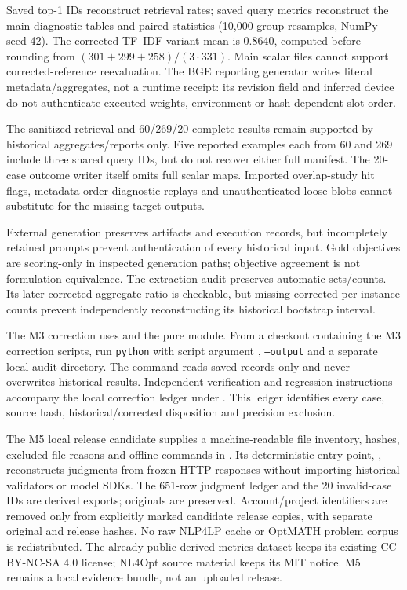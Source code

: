 Saved top-1 IDs reconstruct retrieval rates; saved query metrics reconstruct the main diagnostic tables and paired statistics (10,000 group resamples, NumPy seed 42). The corrected TF--IDF variant mean is 0.8640, computed before rounding from $(301+299+258)/(3\cdot331)$. Main scalar files cannot support corrected-reference reevaluation. The BGE reporting generator writes literal metadata/aggregates, not a runtime receipt: its revision field and inferred device do not authenticate executed weights, environment or hash-dependent slot order.

The sanitized-retrieval and 60/269/20 complete results remain supported by historical aggregates/reports only. Five reported examples each from 60 and 269 include three shared query IDs, but do not recover either full manifest. The 20-case outcome writer itself omits full scalar maps. Imported overlap-study hit flags, metadata-order diagnostic replays and unauthenticated loose blobs cannot substitute for the missing target outputs.

External generation preserves artifacts and execution records, but incompletely retained prompts prevent authentication of every historical input. Gold objectives are scoring-only in inspected generation paths; objective agreement is not formulation equivalence. The extraction audit preserves automatic sets/counts. Its later corrected aggregate ratio is checkable, but missing corrected per-instance counts prevent independently reconstructing its historical bootstrap interval.

The M3 correction uses  and the pure  module. From a checkout containing the M3 correction scripts, run \texttt{python} with script argument , \texttt{--output} and a separate local audit directory. The command reads saved records only and never overwrites historical results. Independent verification and regression instructions accompany the local correction ledger under . This ledger identifies every case, source hash, historical/corrected disposition and precision exclusion.

The M5 local release candidate supplies a machine-readable file inventory, hashes, excluded-file reasons and offline commands in . Its deterministic entry point, , reconstructs judgments from frozen HTTP responses without importing historical validators or model SDKs. The 651-row judgment ledger and the 20 invalid-case IDs are derived exports; originals are preserved. Account/project identifiers are removed only from explicitly marked candidate release copies, with separate original and release hashes. No raw NLP4LP cache or OptMATH problem corpus is redistributed. The already public derived-metrics dataset keeps its existing CC BY-NC-SA 4.0 license; NL4Opt source material keeps its MIT notice. M5 remains a local evidence bundle, not an uploaded release.


